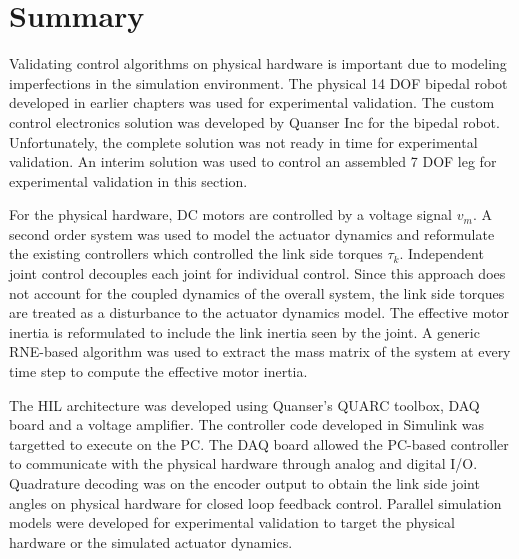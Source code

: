 


\section{Summary} %
\label{sec:experiments_summary}
Validating control algorithms on physical hardware is important due to modeling imperfections in the simulation environment. The physical 14 DOF bipedal robot developed in earlier chapters was used for experimental validation. The custom control electronics solution was developed by Quanser Inc for the bipedal robot. Unfortunately, the complete solution was not ready in time for experimental validation. An interim solution was used to control an assembled 7 DOF leg for experimental validation in this section. 

For the physical hardware, DC motors are controlled by a voltage signal $v_m$. A second order system was used to model the actuator dynamics and reformulate the existing controllers which controlled the link side torques $\tau _k$. Independent joint control decouples each joint for individual control. Since this approach does not account for the coupled dynamics of the overall system, the link side torques are treated as a disturbance to the actuator dynamics model. The effective motor inertia is reformulated to include the link inertia seen by the joint. A generic RNE-based algorithm was used to extract the mass matrix of the system at every time step to compute the effective motor inertia.

The HIL architecture was developed using Quanser's QUARC toolbox, DAQ board and a voltage amplifier. The controller code developed in Simulink was targetted to execute on the PC. The DAQ board allowed the PC-based controller to communicate with the physical hardware through analog and digital I/O. Quadrature decoding was on the encoder output to obtain the link side joint angles on physical hardware for closed loop feedback control. Parallel simulation models were developed for experimental validation to target the physical hardware or the simulated actuator dynamics. 

